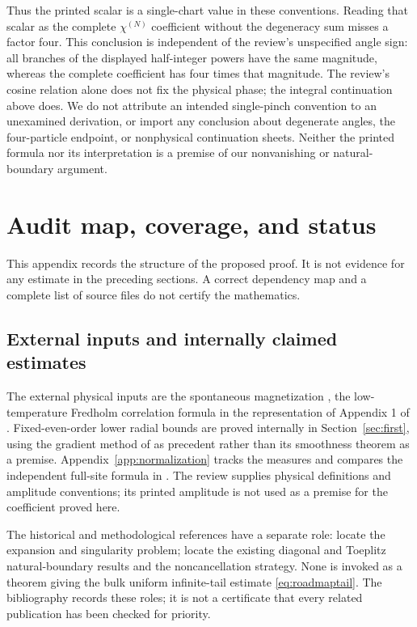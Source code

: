 \documentclass[11pt]{article}
\numberwithin{equation}{section}
\theoremstyle{definition}
\begin{document}
Thus the printed scalar is a single-chart value in these conventions.
Reading that scalar as the complete \(\chi^{(N)}\) coefficient without
the degeneracy sum misses a factor four. This conclusion is independent
of the review's unspecified angle sign: all branches of the displayed
half-integer powers have the same magnitude, whereas the complete
coefficient has four times that magnitude. The review's cosine relation
alone does not fix the physical phase; the integral continuation above
does. We do not attribute an intended single-pinch convention to an
unexamined derivation, or import any conclusion about degenerate angles,
the four-particle endpoint, or nonphysical continuation sheets.
Neither the printed formula nor its interpretation is a premise of
our nonvanishing or natural-boundary argument.



\section{Audit map, coverage, and status}\label{app:auditmap}
This appendix records the structure of the proposed proof. It is not
evidence for any estimate in the preceding sections. A correct
dependency map and a complete list of source files do not certify
the mathematics.

\subsection{External inputs and internally claimed estimates}
The external physical inputs are the spontaneous magnetization
\cite{Yang1952}, the low-temperature Fredholm correlation formula
\cite{PalmerTracy1981} in the representation of Appendix 1 of
\cite{TW2014}. Fixed-even-order lower radial bounds are proved
internally in Section~\ref{sec:first}, using the gradient method of
\cite{TW2014} as precedent rather than its smoothness theorem as a
premise. Appendix~\ref{app:normalization}
tracks the measures and compares the independent full-site formula
in \cite{Boukraa2008}. The review \cite{McCoyMaillard2012}
supplies physical definitions and amplitude conventions; its printed
amplitude is not used as a premise for the coefficient proved here.

The historical and methodological references have a separate role:
\cite{WMTB1976,GuttmannEnting1996,Nickel1999,Nickel2000}
locate the expansion and singularity problem;
\cite{TW2013,TW2017Toeplitz} locate the existing diagonal and
Toeplitz natural-boundary results and the noncancellation strategy.
None is invoked as a theorem giving the bulk uniform infinite-tail
estimate \eqref{eq:roadmaptail}. The bibliography records these
roles; it is not a certificate that every related publication has
been checked for priority.
\end{document}

